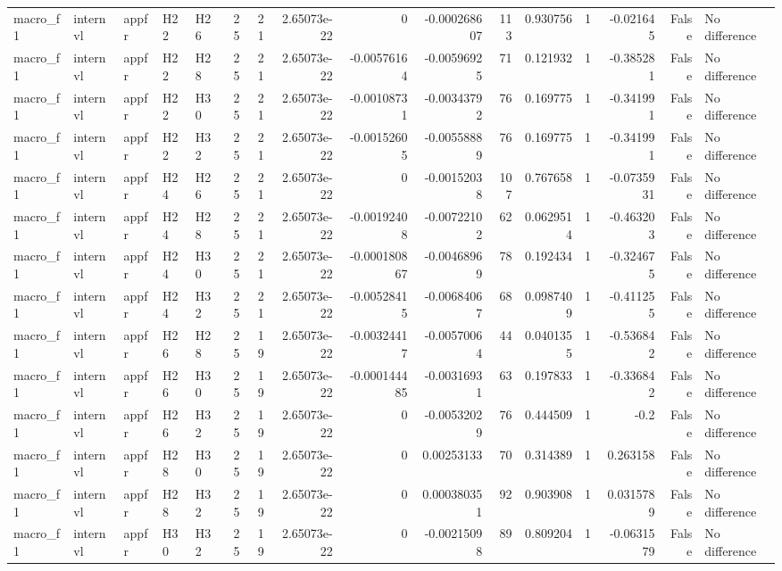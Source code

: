 \begin{longtable}{lllllrrrrrrrrrrl}
macro\_f1 & internvl & appfr & H22 & H26 & 25 & 21 & 2.65073e-22 & 0 & -0.000268607 & 113 & 0.930756 & 1 & -0.021645 & False & No difference \\
macro\_f1 & internvl & appfr & H22 & H28 & 25 & 21 & 2.65073e-22 & -0.00576164 & -0.00596925 & 71 & 0.121932 & 1 & -0.385281 & False & No difference \\
macro\_f1 & internvl & appfr & H22 & H30 & 25 & 21 & 2.65073e-22 & -0.00108731 & -0.00343792 & 76 & 0.169775 & 1 & -0.341991 & False & No difference \\
macro\_f1 & internvl & appfr & H22 & H32 & 25 & 21 & 2.65073e-22 & -0.00152605 & -0.00558889 & 76 & 0.169775 & 1 & -0.341991 & False & No difference \\
macro\_f1 & internvl & appfr & H24 & H26 & 25 & 21 & 2.65073e-22 & 0 & -0.00152038 & 107 & 0.767658 & 1 & -0.0735931 & False & No difference \\
macro\_f1 & internvl & appfr & H24 & H28 & 25 & 21 & 2.65073e-22 & -0.00192408 & -0.00722102 & 62 & 0.0629514 & 1 & -0.463203 & False & No difference \\
macro\_f1 & internvl & appfr & H24 & H30 & 25 & 21 & 2.65073e-22 & -0.000180867 & -0.00468969 & 78 & 0.192434 & 1 & -0.324675 & False & No difference \\
macro\_f1 & internvl & appfr & H24 & H32 & 25 & 21 & 2.65073e-22 & -0.00528415 & -0.00684067 & 68 & 0.0987409 & 1 & -0.411255 & False & No difference \\
macro\_f1 & internvl & appfr & H26 & H28 & 25 & 19 & 2.65073e-22 & -0.00324417 & -0.00570064 & 44 & 0.0401355 & 1 & -0.536842 & False & No difference \\
macro\_f1 & internvl & appfr & H26 & H30 & 25 & 19 & 2.65073e-22 & -0.000144485 & -0.00316931 & 63 & 0.197833 & 1 & -0.336842 & False & No difference \\
macro\_f1 & internvl & appfr & H26 & H32 & 25 & 19 & 2.65073e-22 & 0 & -0.00532029 & 76 & 0.444509 & 1 & -0.2 & False & No difference \\
macro\_f1 & internvl & appfr & H28 & H30 & 25 & 19 & 2.65073e-22 & 0 & 0.00253133 & 70 & 0.314389 & 1 & 0.263158 & False & No difference \\
macro\_f1 & internvl & appfr & H28 & H32 & 25 & 19 & 2.65073e-22 & 0 & 0.000380351 & 92 & 0.903908 & 1 & 0.0315789 & False & No difference \\
macro\_f1 & internvl & appfr & H30 & H32 & 25 & 19 & 2.65073e-22 & 0 & -0.00215098 & 89 & 0.809204 & 1 & -0.0631579 & False & No difference \\

\end{longtable}
